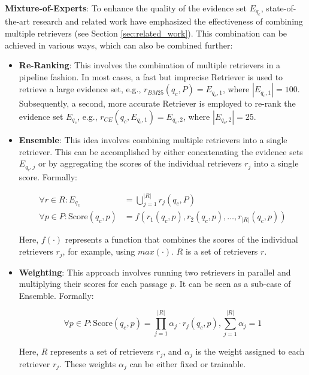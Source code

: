 \vspace{\baselineskip}

\textbf{Mixture-of-Experts}: To enhance the quality of the evidence set $E_{q_c}$, state-of-the-art research and related work have emphasized the effectiveness of combining multiple retrievers (see Section \ref{sec:related_work}). This combination can be achieved in various ways, which can also be combined further:

\begin{itemize}
    \item \textbf{Re-Ranking}: This involves the combination of multiple retrievers in a pipeline fashion. In most cases, a fast but imprecise Retriever is used to retrieve a large evidence set, e.g., $r_{BM25}(q_c,P) = E_{q_c,1}$, where $|E_{q_c,1}| = 100$. Subsequently, a second, more accurate Retriever is employed to re-rank the evidence set $E_{q_c}$, e.g., $r_{CE}(q_c,E_{q_c,1}) = E_{q_c,2}$, where $|E_{q_c,2}| = 25$.
    
    \item \textbf{Ensemble}: This idea involves combining multiple retrievers into a single retriever. This can be accomplished by either concatenating the evidence sets $E_{q_c,j}$ or by aggregating the scores of the individual retrievers $r_j$ into a single score. Formally:
    
    \begin{align}
        \forall r \in R: E_{q_c} &= \bigcup_{j=1}^{|R|} r_j(q_c, P) \\
        \forall p \in P: \text{Score}(q_c, p) &= f(r_1(q_c, p), r_2(q_c, p), \dots, r_{|R|}(q_c, p))
    \end{align}
    
    Here, $f(\cdot)$ represents a function that combines the scores of the individual retrievers $r_j$, for example, using $max(\cdot)$. $R$ is a set of retrievers $r$.
    
    \item \textbf{Weighting}: This approach involves running two retrievers in parallel and multiplying their scores for each passage $p$. It can be seen as a sub-case of Ensemble. Formally:
    
    \begin{equation}
        \forall p \in P: \text{Score}(q_c, p) = \prod_{j=1}^{|R|} \alpha_j \cdot r_j(q_c, p), \sum_{j=1}^{|R|} \alpha_j = 1
    \end{equation}
    
    Here, $R$ represents a set of retrievers $r_j$, and $\alpha_j$ is the weight assigned to each retriever $r_j$. These weights $\alpha_j$ can be either fixed or trainable.
\end{itemize}

